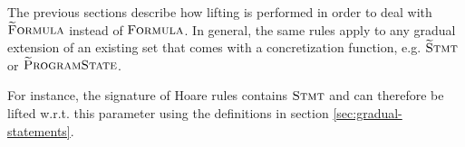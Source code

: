 The previous sections describe how lifting is performed in order to deal with $\textup{\textsc{\ensuremath{\widetilde{\text{F}}}ormula}}$ instead of $\textup{\textsc{Formula}}$.
In general, the same rules apply to any gradual extension of an existing set that comes with a concretization function, e.g. $\textup{\textsc{\ensuremath{\widetilde{\text{S}}}tmt}}$ or $\textup{\textsc{\ensuremath{\widetilde{\text{P}}}rogramState}}$.

For instance, the signature of Hoare rules contains $\textup{\textsc{Stmt}}$ and can therefore be lifted w.r.t. this parameter using the definitions in section \ref{sec:gradual-statements}.